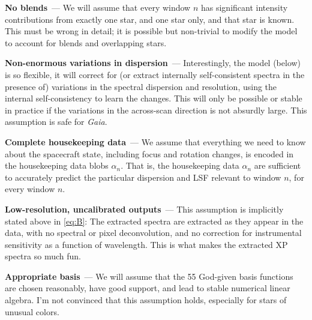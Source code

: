 \documentclass[11pt]{article}
\renewcommand{\paragraph}[1]{\medskip\par\noindent\textbf{#1}~---}
\begin{document}
\paragraph{No blends}
We will assume that every window $n$ has significant intensity contributions from exactly one star, and one star only, and that star is known.
This must be wrong in detail; it is possible but non-trivial to modify the model to account for blends and overlapping stars.

\paragraph{Non-enormous variations in dispersion}
Interestingly, the model (below) is so flexible, it will correct for (or extract internally self-consistent spectra in the presence of) variations in the spectral dispersion and resolution, using the internal self-consistency to learn the changes.
This will only be possible or stable in practice if the variations in the across-scan direction is not absurdly large.
This assumption is safe for \textsl{Gaia}.

\paragraph{Complete housekeeping data}
We assume that everything we need to know about the spacecraft state, including focus and rotation changes, is encoded in the housekeeping data blobs $\alpha_n$.
That is, the housekeeping data $\alpha_n$ are sufficient to accurately predict the particular dispersion and LSF relevant to window $n$, for every window $n$.

\paragraph{Low-resolution, uncalibrated outputs}
This assumption is implicitly stated above in \eqref{eq:B}:
The extracted spectra are extracted as they appear in the data, with no spectral or pixel deconvolution, and no correction for instrumental sensitivity as a function of wavelength.
This is what makes the extracted XP spectra so much fun.

\paragraph{Appropriate basis}
We will assume that the 55 God-given basis functions are chosen reasonably, have good support, and lead to stable numerical linear algebra.
I'm not convinced that this assumption holds, especially for stars of unusual colors.
\end{document}
